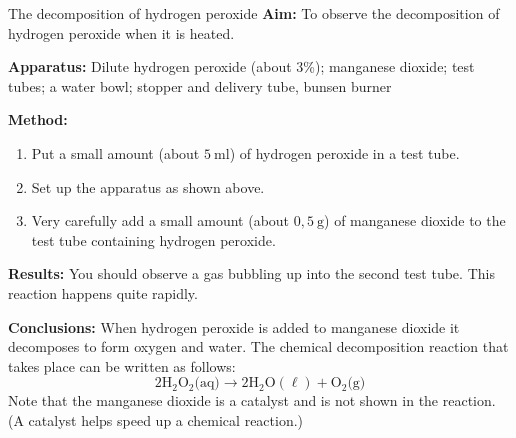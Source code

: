             \begin{g_experiment}{The decomposition of hydrogen peroxide}
            \nopagebreak
            \label{m38709*id63175}\noindent{}\textbf{Aim:}\newline
    To observe the decomposition of hydrogen peroxide when it is heated.\par 
        \label{m38709*id63194}\noindent{}\textbf{Apparatus:}\newline
    Dilute hydrogen peroxide (about 3\%); manganese dioxide; test tubes; a water bowl; stopper and delivery tube, bunsen burner\par 
        \label{m38709*eip-470}
	\par
      \label{m38709*id63199}
    \setcounter{subfigure}{0}
	\begin{figure}[H] %
    \begin{center}
    \end{center}
 \end{figure}       
        \par 
        \label{m38709*id63206}\noindent{}\textbf{Method:}\label{m38709*id63212}\begin{enumerate}[noitemsep, label=\textbf{\arabic*}. ] 
            \label{m38709*uid11}\item Put a small amount (about $5~\text{ml}$) of hydrogen peroxide in a test tube.
\label{m38709*uid12}\item Set up the apparatus as shown above.
\label{m38709*uid13}\item Very carefully add a small amount (about $0,5~\text{g}$) of manganese dioxide to the test tube containing hydrogen peroxide. 
\end{enumerate}
        \par 
        \label{m38709*id63254}\noindent{}\textbf{Results:}\newline
    You should observe a gas bubbling up into the second test tube. This reaction happens quite rapidly. \par 
        \label{m38709*id63302}\noindent{}\textbf{Conclusions:}\newline
    When hydrogen peroxide is added to manganese dioxide it decomposes to form oxygen and water. The chemical decomposition reaction that takes place can be written as follows:
        \label{m38709*id63313}\nopagebreak\noindent{}
    \begin{equation*}
    2{\text{H}}_{2}{\text{O}}_{2} \text{(aq)} \to 2\text{H}_{2}\text{O}(\ell) + {\text{O}}_{2}\text{(g)}
      \end{equation*}
Note that the manganese dioxide is a catalyst and is not shown in the reaction. (A catalyst helps speed up a chemical reaction.)    \par 
\end{g_experiment}
